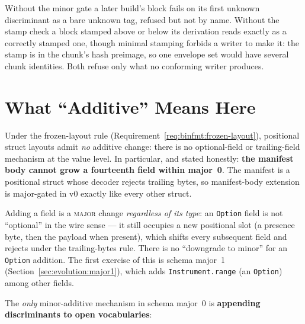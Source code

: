 \documentclass[11pt,letterpaper]{report}
\begin{document}
\begin{rationale}
  Without the minor gate a later build's block fails on its first unknown
  discriminant as a bare unknown tag, refused but not by name. Without the
  stamp check a block stamped above or below its derivation reads exactly as
  a correctly stamped one, though minimal stamping forbids a writer to make
  it: the stamp is in the chunk's hash preimage, so one envelope set would
  have several chunk identities. Both refuse only what no conforming writer
  produces.
\end{rationale}

\section{What ``Additive'' Means Here}
\label{sec:evolution:additive}

Under the frozen-layout rule (Requirement~\ref{req:binfmt:frozen-layout}),
positional struct layouts admit \emph{no} additive change: there is no
optional-field or trailing-field mechanism at the value level. In
particular, and stated honestly: \textbf{the manifest body cannot grow a
fourteenth field within major~0}. The manifest is a positional struct whose
decoder rejects trailing bytes, so manifest-body extension is
major-gated in v0 exactly like every other struct.

Adding a field is a \textsc{major} change \emph{regardless of its type}: an
\texttt{Option} field is not ``optional'' in the wire sense --- it still
occupies a new positional slot (a presence byte, then the payload when
present), which shifts every subsequent field and rejects under the
trailing-bytes rule. There is no ``downgrade to minor'' for an \texttt{Option}
addition. The first exercise of this is schema major~1
(Section~\ref{sec:evolution:major1}), which adds \texttt{Instrument.range}
(an \texttt{Option}) among other fields.

The \emph{only} minor-additive mechanism in schema major~0 is
\textbf{appending discriminants to open vocabularies}:
\end{document}
